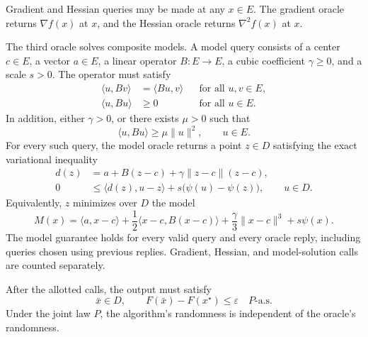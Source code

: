 \documentclass[10pt]{article}
\theoremstyle{definition}
\begin{document}
Gradient and Hessian queries may be made at any $x\in E$. The gradient oracle returns $\nabla f(x)$ at $x$, and the Hessian oracle returns $\nabla^2 f(x)$ at $x$.

The third oracle solves composite models. A model query consists of a center $c\in E$, a vector $a\in E$, a linear operator $B:E\to E$, a cubic coefficient $\gamma\geq 0$, and a scale $s>0$. The operator must satisfy
\[
\begin{aligned}
\langle u,Bv\rangle&=\langle Bu,v\rangle
&&\text{for all }u,v\in E,\\
\langle u,Bu\rangle&\geq 0
&&\text{for all }u\in E.
\end{aligned}
\]
In addition, either $\gamma>0$, or there exists $\mu>0$ such that
\[
\langle u,Bu\rangle\geq\mu\|u\|^2,
\qquad u\in E.
\]
For every such query, the model oracle returns a point $z\in D$ satisfying the exact variational inequality
\[
\begin{aligned}
d(z)&=a+B(z-c)+\gamma\|z-c\|(z-c),\\
0&\leq\langle d(z),u-z\rangle
+s\bigl(\psi(u)-\psi(z)\bigr),
\qquad u\in D.
\end{aligned}
\]
Equivalently, $z$ minimizes over $D$ the model
\[
M(x)=\langle a,x-c\rangle
+\frac{1}{2}\langle x-c,B(x-c)\rangle
+\frac{\gamma}{3}\|x-c\|^3+s\psi(x).
\]
The model guarantee holds for every valid query and every oracle reply, including queries chosen using previous replies. Gradient, Hessian, and model-solution calls are counted separately.

After the allotted calls, the output must satisfy
\[
\bar{x}\in D,
\qquad F(\bar{x})-F(x^\star)\leq\varepsilon
\quad P\text{-a.s.}
\]
Under the joint law $P$, the algorithm's randomness is independent of the oracle's randomness.
\end{document}
